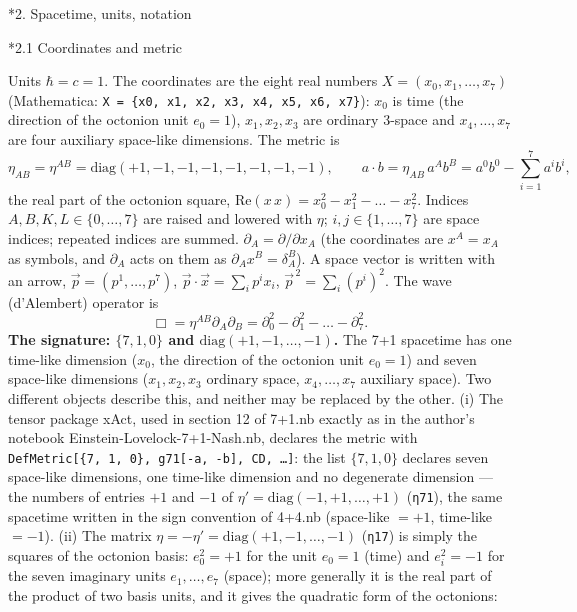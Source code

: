 \documentclass[10pt,a4paper]{article}
\makeatletter
\renewcommand\section{\@startsection{section}{1}{\z@}{-3.5ex \@plus -1ex \@minus -.2ex}{2.3ex \@plus.2ex}{\normalfont\Large\bfseries\raggedright}}
\renewcommand\subsection{\@startsection{subsection}{2}{\z@}{-3.25ex\@plus -1ex \@minus -.2ex}{1.5ex \@plus .2ex}{\normalfont\large\bfseries\raggedright}}
\makeatother
\begin{document}
\section*{2. Spacetime, units, notation}
\subsection*{2.1 Coordinates and metric}
Units $\hbar=c=1$. The coordinates are the eight real numbers $X=(x_0,x_1,\dots,x_7)$ (Mathematica: \texttt{X = \{x0, x1, x2, x3, x4, x5, x6, x7\}}): $x_0$ is time (the direction of the octonion unit $e_0=1$), $x_1,x_2,x_3$ are ordinary 3-space and $x_4,\dots,x_7$ are four auxiliary space-like dimensions. The metric is
\begin{equation*}
\eta_{AB}=\eta^{AB}=\mathrm{diag}(+1,-1,-1,-1,-1,-1,-1,-1),\qquad a\cdot b=\eta_{AB}\,a^Ab^B=a^0b^0-\sum_{i=1}^{7}a^ib^i,
\end{equation*}
the real part of the octonion square, $\mathrm{Re}(x\,x)=x_0^2-x_1^2-\dots-x_7^2$. Indices $A,B,K,L\in\lbrace0,\dots,7\rbrace$ are raised and lowered with $\eta$; $i,j\in\lbrace1,\dots,7\rbrace$ are space indices; repeated indices are summed. $\partial_A=\partial/\partial x_A$ (the coordinates are $x^A=x_A$ as symbols, and $\partial_A$ acts on them as $\partial_Ax^B=\delta_A^B$). A space vector is written with an arrow, $\vec p=(p^1,\dots,p^7)$, $\vec p\cdot\vec x=\sum_ip^ix_i$, $\vec p^{\,2}=\sum_i(p^i)^2$. The wave (d’Alembert) operator is
\begin{equation*}
\Box=\eta^{AB}\partial_A\partial_B=\partial_0^2-\partial_1^2-\dots-\partial_7^2 .
\end{equation*}
\textbf{The signature: $\{7,1,0\}$ and $\mathrm{diag}(+1,-1,\dots,-1)$.} The 7+1 spacetime has one time-like dimension ($x_0$, the direction of the octonion unit $e_0=1$) and seven space-like dimensions ($x_1,x_2,x_3$ ordinary space, $x_4,\dots,x_7$ auxiliary space). Two different objects describe this, and neither may be replaced by the other. (i) The tensor package xAct, used in section 12 of 7+1.nb exactly as in the author’s notebook Einstein-Lovelock-7+1-Nash.nb, declares the metric with \texttt{DefMetric[\{7, 1, 0\}, g71[-a, -b], CD, …]}: the list $\{7,1,0\}$ declares seven space-like dimensions, one time-like dimension and no degenerate dimension — the numbers of entries $+1$ and $-1$ of $\eta'=\mathrm{diag}(-1,+1,\dots,+1)$ (\texttt{η71}), the same spacetime written in the sign convention of 4+4.nb (space-like $=+1$, time-like $=-1$). (ii) The matrix $\eta=-\eta'=\mathrm{diag}(+1,-1,\dots,-1)$ (\texttt{η17}) is simply the squares of the octonion basis: $e_0^2=+1$ for the unit $e_0=1$ (time) and $e_i^2=-1$ for the seven imaginary units $e_1,\dots,e_7$ (space); more generally it is the real part of the product of two basis units, and it gives the quadratic form of the octonions:
\end{document}
